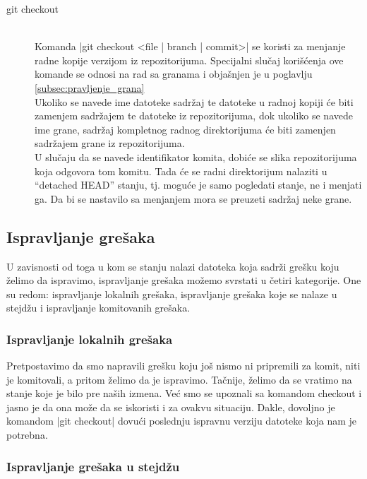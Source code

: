 \documentclass[a4paper]{article}
\begin{document}
{\begin{description}
\item[git checkout] \hfill \\
\label{checkout}
Komanda |git checkout <file | branch | commit>| se koristi za menjanje radne kopije verzijom iz repozitorijuma. Specijalni slučaj korišćenja ove komande se odnosi na rad sa granama i objašnjen je u poglavlju \ref{subsec:pravljenje_grana}\\

Ukoliko se navede ime datoteke sadržaj te datoteke u radnoj kopiji će biti zamenjem sadržajem te datoteke iz repozitorijuma, dok ukoliko se navede ime grane, sadržaj kompletnog radnog direktorijuma će biti zamenjen sadržajem grane iz repozitorijuma.\\

U slučaju da se navede identifikator komita, dobiće se slika repozitorijuma koja odgovora tom komitu. Tada će se radni direktorijum nalaziti u ``detached HEAD'' stanju, tj. moguće je samo pogledati stanje, ne i menjati ga. Da bi se nastavilo sa menjanjem mora se preuzeti sadržaj neke grane.

\end{description}

\subsection{Ispravljanje grešaka}
\label{subsec:greske}

U zavisnosti od toga u kom se stanju nalazi datoteka koja sadrži grešku koju želimo da ispravimo, ispravljanje grešaka možemo svrstati u četiri kategorije. One su redom: ispravljanje lokalnih grešaka, ispravljanje grešaka koje se nalaze u stejdžu i ispravljanje komitovanih grešaka.

\subsubsection*{Ispravljanje lokalnih grešaka}
\label{lokalne_greske}
Pretpostavimo da smo napravili grešku koju još nismo ni pripremili za komit, niti je komitovali, a pritom želimo da je ispravimo. Tačnije, želimo da se vratimo na stanje koje je bilo pre naših izmena. Već smo se upoznali sa komandom checkout i jasno je da ona može da se iskoristi i za ovakvu situaciju. Dakle, dovoljno je komandom |git checkout| dovući poslednju ispravnu verziju datoteke koja nam je potrebna.

\subsubsection*{Ispravljanje grešaka u stejdžu}
\label{staging_greske}

}
\end{document}
